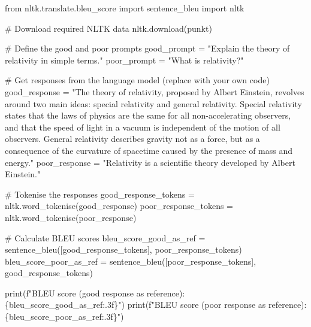 \documentclass[
]{agujournal2019}
\newenvironment{Shaded}{\begin{snugshade}}{\end{snugshade}}
\newcommand{\BuiltInTok}[1]{\textcolor[rgb]{0.00,0.23,0.31}{#1}}
\newcommand{\CommentTok}[1]{\textcolor[rgb]{0.37,0.37,0.37}{#1}}
\newcommand{\ImportTok}[1]{\textcolor[rgb]{0.00,0.46,0.62}{#1}}
\newcommand{\NormalTok}[1]{\textcolor[rgb]{0.00,0.23,0.31}{#1}}
\newcommand{\OperatorTok}[1]{\textcolor[rgb]{0.37,0.37,0.37}{#1}}
\newcommand{\SpecialCharTok}[1]{\textcolor[rgb]{0.37,0.37,0.37}{#1}}
\newcommand{\SpecialStringTok}[1]{\textcolor[rgb]{0.13,0.47,0.30}{#1}}
\newcommand{\StringTok}[1]{\textcolor[rgb]{0.13,0.47,0.30}{#1}}
\begin{document}
\begin{Shaded}
\begin{Highlighting}[]
\ImportTok{from}\NormalTok{ nltk.translate.bleu\_score }\ImportTok{import}\NormalTok{ sentence\_bleu}
\ImportTok{import}\NormalTok{ nltk}

\CommentTok{\# Download required NLTK data}
\NormalTok{nltk.download(}\StringTok{\textquotesingle{}punkt\textquotesingle{}}\NormalTok{)}

\CommentTok{\# Define the good and poor prompts}
\NormalTok{good\_prompt }\OperatorTok{=} \StringTok{"Explain the theory of relativity in simple terms."}
\NormalTok{poor\_prompt }\OperatorTok{=} \StringTok{"What is relativity?"}

\CommentTok{\# Get responses from the language model (replace with your own code)}
\NormalTok{good\_response }\OperatorTok{=} \StringTok{"The theory of relativity, proposed by Albert Einstein, revolves around two main ideas: special relativity and general relativity. Special relativity states that the laws of physics are the same for all non{-}accelerating observers, and that the speed of light in a vacuum is independent of the motion of all observers. General relativity describes gravity not as a force, but as a consequence of the curvature of spacetime caused by the presence of mass and energy."}
\NormalTok{poor\_response }\OperatorTok{=} \StringTok{"Relativity is a scientific theory developed by Albert Einstein."}

\CommentTok{\# Tokenise the responses}
\NormalTok{good\_response\_tokens }\OperatorTok{=}\NormalTok{ nltk.word\_tokenise(good\_response)}
\NormalTok{poor\_response\_tokens }\OperatorTok{=}\NormalTok{ nltk.word\_tokenise(poor\_response)}

\CommentTok{\# Calculate BLEU scores}
\NormalTok{bleu\_score\_good\_as\_ref }\OperatorTok{=}\NormalTok{ sentence\_bleu([good\_response\_tokens], poor\_response\_tokens)}
\NormalTok{bleu\_score\_poor\_as\_ref }\OperatorTok{=}\NormalTok{ sentence\_bleu([poor\_response\_tokens], good\_response\_tokens)}

\BuiltInTok{print}\NormalTok{(}\SpecialStringTok{f"BLEU score (good response as reference): }\SpecialCharTok{\{}\NormalTok{bleu\_score\_good\_as\_ref}\SpecialCharTok{:.3f\}}\SpecialStringTok{"}\NormalTok{)}
\BuiltInTok{print}\NormalTok{(}\SpecialStringTok{f"BLEU score (poor response as reference): }\SpecialCharTok{\{}\NormalTok{bleu\_score\_poor\_as\_ref}\SpecialCharTok{:.3f\}}\SpecialStringTok{"}\NormalTok{)}
\end{Highlighting}
\end{Shaded}
\end{document}
